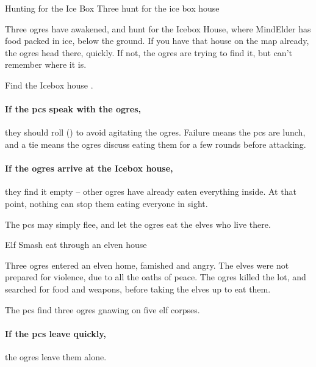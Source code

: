 \begin{multicols}{2}
{Hunting for the Ice Box}%
{Three  hunt for the ice box house}%
\label{ogresEatIcebox}

Three \glspl{ogre} have awakened, and hunt for the Icebox House, where \gls{MindElder} has food packed in ice, below the ground.
If you have that house on the map already, the \glspl{ogre} head there, quickly.
If not, the \glspl{ogre} are trying to find it, but can't remember where it is.

Find the Icebox house .


\paragraph{If the \glspl{pc} speak with the \glspl{ogre},}
they should roll  (\tn[10]) to avoid agitating the \glspl{ogre}.
Failure means the \glspl{pc} are lunch, and a tie means the \glspl{ogre} discuss eating them for a few \glspl{round} before attacking.

\paragraph{If the \glspl{ogre} arrive at the Icebox house,}
they find it empty -- other \glspl{ogre} have already eaten everything inside.
At that point, nothing can stop them eating everyone in sight.

The \glspl{pc} may simply flee, and let the \glspl{ogre} eat the elves who live there.

{Elf Smash}%
{ eat through an elven house}%

\begin{exampletext}
  Three \glspl{ogre} entered an elven home, famished and angry.
  The elves were not prepared for violence, due to all the oaths of peace.
  The \glspl{ogre} killed the lot, and searched for food and \glspl{weapon}, before taking the elves up to eat them.
\end{exampletext}

The \glspl{pc} find three \glspl{ogre} gnawing on five elf corpses.

\paragraph{If the \glspl{pc} leave quickly,}
the \glspl{ogre} leave them alone.


\end{multicols}
